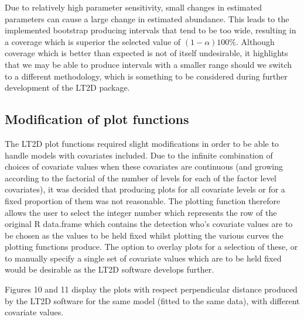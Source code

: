 \documentclass[11pt]{article}
\begin{document}
\begin{multicols}{2}
Due to relatively high parameter sensitivity, small changes in estimated parameters can cause a large change in estimated abundance. This leads to the implemented bootstrap producing intervals that tend to be too wide, resulting in a coverage which is superior the selected value of $(1-\alpha) 100\%$. Although coverage which is better than expected is not of itself undesirable, it highlights that we may be able to produce intervals with a smaller range should we switch to a different methodology, which is something to be considered during further development of the LT2D package. 


\subsection{Modification of plot functions}
The LT2D plot functions required slight modifications in order to be able to handle models with covariates included. Due to the infinite combination of choices of covariate values when these covariates are continuous (and growing according to the factorial of the number of levels for each of the factor level covariates), it was decided that producing plots for all covariate levels or for a fixed proportion of them was not reasonable. The plotting function therefore allows the user to select the integer number which represents the row of the original R data.frame which contains the detection who's covariate values are to be chosen as the values to be held fixed whilst plotting the various curves the plotting functions produce.  The option to overlay plots for a selection of these, or to manually specify a single set of covariate values which are to be held fixed would be desirable as the LT2D software develops further.

Figures 10 and 11 display the plots with respect perpendicular distance produced by the LT2D software for the same model (fitted to the same data), with different covariate values. 



\end{multicols}
\end{document}
